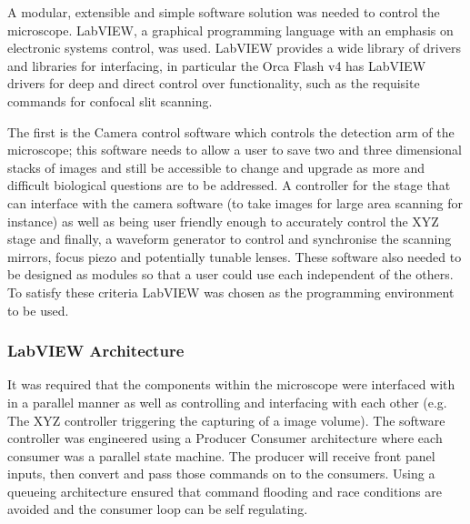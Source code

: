 A modular, extensible and simple software solution was needed to control the microscope.
LabVIEW, a graphical programming language with an emphasis on electronic systems control, was used.
LabVIEW provides a wide library of drivers and libraries for interfacing, in particular the Orca Flash v4 has LabVIEW drivers for deep and direct control over functionality, such as the requisite commands for confocal slit scanning.

The first is the Camera control software which controls the detection arm of the microscope; this software needs to allow a user to save two and three dimensional stacks of images and still be accessible to change and upgrade as more and difficult biological questions are to be addressed.
A controller for the stage that can interface with the camera software (to take images for large area scanning for instance) as well as being user friendly enough to accurately control the XYZ stage and finally, a waveform generator to control and synchronise the scanning mirrors, focus piezo and potentially tunable lenses.
These software also needed to be designed as modules so that a user could use each independent of the others.
To satisfy these criteria LabVIEW was chosen as the programming environment to be used.

\subsubsection{LabVIEW Architecture}


It was required that the components within the microscope were interfaced with in a parallel manner as well as controlling and interfacing with each other (e.g. The XYZ controller triggering the capturing of a image volume).
The software controller was engineered using a Producer Consumer architecture where each consumer was a parallel state machine.
The producer will receive front panel inputs, then convert and pass those commands on to the consumers.
Using a queueing architecture ensured that command flooding and race conditions are avoided and the consumer loop can be self regulating.

